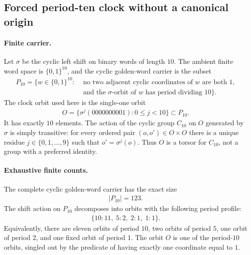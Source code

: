 
\subsection{Forced period-ten clock without a canonical origin}
\label{sec:window6-clock-coupling-cert-basepoint-free-gauge}

\paragraph{Finite carrier.}
Let $\sigma$ be the cyclic left shift on binary words of length $10$. The ambient finite word space is $\{0,1\}^{10}$, and the cyclic golden-word carrier is the subset
$$
\begin{aligned}
P_{10}=\{w\in \{0,1\}^{10}:&\text{ no two adjacent cyclic coordinates of }w\text{ are both }1,\\
&\text{ and the }\sigma\text{-orbit of }w\text{ has period dividing }10\}.
\end{aligned}
$$
The clock orbit used here is the single-one orbit
$$
\begin{aligned}
O=\{\sigma^j(0000000001):0\leq j<10\}\subset P_{10}.
\end{aligned}
$$
It has exactly $10$ elements. The action of the cyclic group $C_{10}$ on $O$ generated by $\sigma$ is simply transitive: for every ordered pair $(o,o')\in O\times O$ there is a unique residue $j\in \{0,1,\ldots,9\}$ such that $o'=\sigma^j(o)$. Thus $O$ is a torsor for $C_{10}$, not a group with a preferred identity.

\paragraph{Exhaustive finite counts.}
The complete cyclic golden-word carrier has the exact size
$$
\begin{aligned}
|P_{10}|=123.
\end{aligned}
$$
The shift action on $P_{10}$ decomposes into orbits with the following period profile:
$$
\begin{aligned}
\{10:11,\;5:2,\;2:1,\;1:1\}.
\end{aligned}
$$
Equivalently, there are eleven orbits of period $10$, two orbits of period $5$, one orbit of period $2$, and one fixed orbit of period $1$. The orbit $O$ is one of the period-$10$ orbits, singled out by the predicate of having exactly one coordinate equal to $1$.

